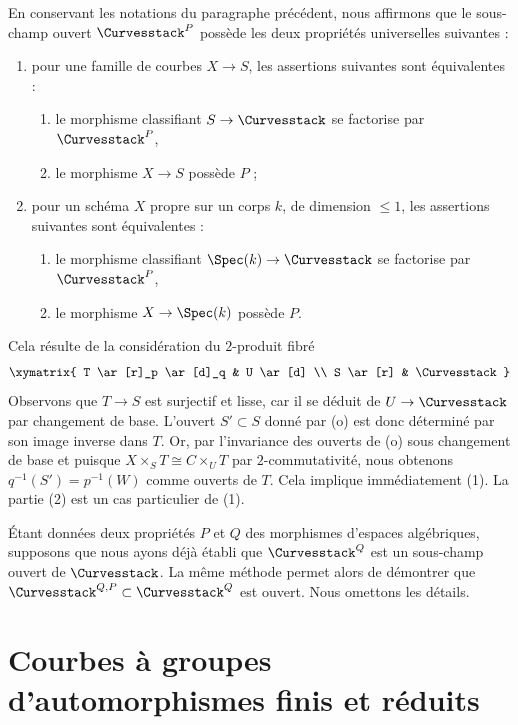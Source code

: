 \medskip\noindent
En conservant les notations du paragraphe précédent, nous affirmons que
le sous-champ ouvert $\Curvesstack^P$ possède les deux propriétés
universelles suivantes :
\begin{enumerate}
\item pour une famille de courbes $X \to S$, les assertions suivantes
sont équivalentes :
\begin{enumerate}
\item le morphisme classifiant $S \to \Curvesstack$ se factorise par
$\Curvesstack^P$,
\item le morphisme $X \to S$ possède $P$ ;
\end{enumerate}
\item pour un schéma $X$ propre sur un corps $k$, de dimension $\leq 1$,
les assertions suivantes sont équivalentes :
\begin{enumerate}
\item le morphisme classifiant $\Spec(k) \to \Curvesstack$ se factorise
par $\Curvesstack^P$,
\item le morphisme $X \to \Spec(k)$ possède $P$.
\end{enumerate}
\end{enumerate}
Cela résulte de la considération du $2$-produit fibré
$$
\xymatrix{
T \ar[r]_p \ar[d]_q & U \ar[d] \\
S \ar[r] & \Curvesstack
}
$$
Observons que $T \to S$ est surjectif et lisse, car il se déduit de
$U \to \Curvesstack$ par changement de base. L'ouvert $S' \subset S$
donné par (o) est donc déterminé par son image inverse dans $T$.
Or, par l'invariance des ouverts de (o) sous changement de base et puisque
$X \times_S T \cong C \times_U T$ par $2$-commutativité, nous obtenons
$q^{-1}(S') = p^{-1}(W)$ comme ouverts de $T$.
Cela implique immédiatement (1). La partie (2) est un cas particulier de (1).

\medskip\noindent
Étant données deux propriétés $P$ et $Q$ des morphismes d'espaces
algébriques, supposons que nous ayons déjà établi que $\Curvesstack^Q$
est un sous-champ ouvert de $\Curvesstack$. La même méthode permet alors
de démontrer que
$\Curvesstack^{Q, P} \subset \Curvesstack^Q$ est ouvert.
Nous omettons les détails.



\section{Courbes à groupes d'automorphismes finis et réduits}
\label{section-finite-aut}

